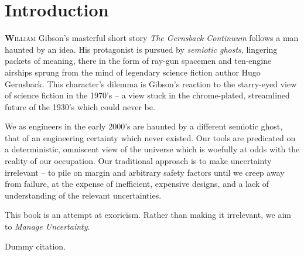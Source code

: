 \documentclass[../primer.tex]{subfiles}
\begin{document}
\chapter{Introduction}
\lettrine[findent=2pt]{\textbf{W}}{illiam} Gibson's masterful short story
\emph{The Gernsback Continuum}\cite{gibson1986chrome} follows a man haunted by
an idea. His protagonist is pursued by \emph{semiotic ghosts}, lingering packets
of meaning, there in the form of ray-gun spacemen and ten-engine airships sprung
from the mind of legendary science fiction author Hugo Gernsback. This
character's dilemma is Gibson's reaction to the starry-eyed view of science
fiction in the 1970's -- a view stuck in the chrome-plated, streamlined future
of the 1930's which could never be.

We as engineers in the early 2000's are haunted by a different semiotic ghost,
that of an engineering certainty which never existed. Our tools are predicated
on a deterministic, omniscent view of the universe which is woefully at odds
with the reality of our occupation. Our traditional approach is to make
uncertainty irrelevant -- to pile on margin and arbitrary safety factors until
we creep away from failure, at the expense of inefficient, expensive designs,
and a lack of understanding of the relevant uncertainties.

This book is an attempt at exoricism. Rather than making it irrelevant, we aim
to \emph{Manage Uncertainty}.

Dummy citation.\cite{shvartsman2016}
\end{document}
